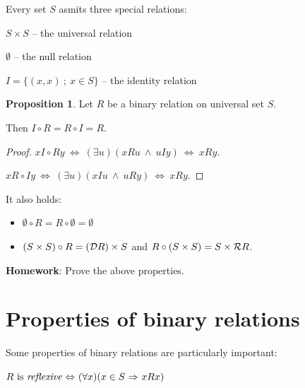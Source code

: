 \documentclass[11pt,paper=b5,footinclude,headinclude]{scrbook} %
\def\inn {{~\wedge~}}
\def\sledi {{~\Rightarrow~}}
\def\cee {{~\Leftrightarrow~}}
\theoremstyle{remark}
\theoremstyle{definition} %
\theoremstyle{theorem} %
\newtheorem*{proposition}{Proposition}
\begin{document}
Every set $S$ asmits three special relations:

$S\times S$ -- the universal relation

$\emptyset$ -- the null relation

$I = \{(x,x)~;~x\in S\}$ -- the identity relation

\begin{proposition}
Let $R$ be a binary relation on universal set $S$.

Then $I\circ R = R\circ I = R$.
\end{proposition}

\begin{proof}
$xI\circ Ry \cee (\exists u)(xRu \inn uIy) \cee xRy$.

$xR\circ Iy \cee (\exists u)(xIu \inn uRy) \cee xRy$.
\end{proof}

\medskip
It also holds:

\begin{itemize}
  \item $\emptyset \circ R = R\circ \emptyset = \emptyset$
  \item $(S\times S)\circ R =
({\cal D}R) \times S$ and $R\circ (S\times S) = S\times {\cal R}R$.
\end{itemize}

%

\bigskip

\textbf{ Homework}: Prove the above properties.


\section{Properties of binary relations}

Some properties of binary relations are particularly important:

\bigskip

$R \textrm{ is {\em reflexive}} \cee (\forall x)(x\in S\sledi xRx)$

\end{document}
